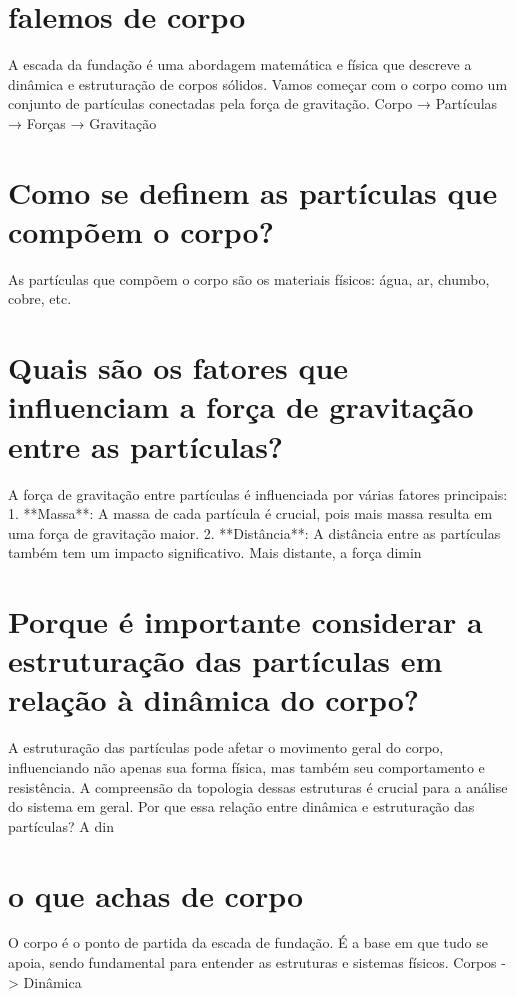 \documentclass[11pt,a4paper]{article}
\begin{document}
\maketitle
\begin{abstract}Exploração do ollama a partir de sementes banais (nível 1). Teoria continua de fora.\end{abstract}
\section{falemos de corpo}
A escada da fundação é uma abordagem matemática e física que descreve a dinâmica e estruturação de corpos sólidos. Vamos começar com o corpo como um conjunto de partículas conectadas pela força de gravitação. Corpo → Partículas → Forças → Gravitação

\section{Como se definem as partículas que compõem o corpo?}
As partículas que compõem o corpo são os materiais físicos: água, ar, chumbo, cobre, etc.

\section{Quais são os fatores que influenciam a força de gravitação entre as partículas?}
A força de gravitação entre partículas é influenciada por várias fatores principais: 1. **Massa**: A massa de cada partícula é crucial, pois mais massa resulta em uma força de gravitação maior. 2. **Distância**: A distância entre as partículas também tem um impacto significativo. Mais distante, a força dimin

\section{Porque é importante considerar a estruturação das partículas em relação à dinâmica do corpo?}
A estruturação das partículas pode afetar o movimento geral do corpo, influenciando não apenas sua forma física, mas também seu comportamento e resistência. A compreensão da topologia dessas estruturas é crucial para a análise do sistema em geral. Por que essa relação entre dinâmica e estruturação das partículas? A din

\section{o que achas de corpo}
O corpo é o ponto de partida da escada de fundação. É a base em que tudo se apoia, sendo fundamental para entender as estruturas e sistemas físicos. Corpos -> Dinâmica
\end{document}

